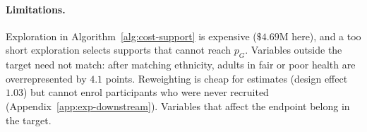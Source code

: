 \documentclass[twoside]{article}
\begin{document}
\paragraph{Limitations.}
Exploration in Algorithm~\ref{alg:cost-support} is expensive (\(\$4.69\)M
here), and a too short exploration
selects supports that cannot reach \(p_G\). Variables outside the target
need not match: after matching ethnicity, adults in fair or poor health are
overrepresented by \(4.1\) points. Reweighting is cheap for estimates
(design effect \(1.03\)) but cannot enrol participants who were never
recruited (Appendix~\ref{app:exp-downstream}).
Variables that affect the endpoint belong in the target.



\end{document}
